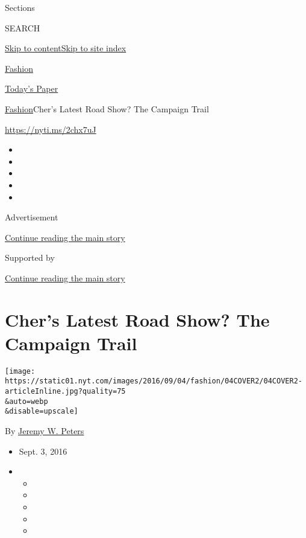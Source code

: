 Sections

SEARCH

\protect\hyperlink{site-content}{Skip to
content}\protect\hyperlink{site-index}{Skip to site index}

\href{https://www.nytimes.com/section/fashion}{Fashion}

\href{https://myaccount.nytimes.com/auth/login?response_type=cookie\&client_id=vi}{}

\href{https://www.nytimes.com/section/todayspaper}{Today's Paper}

\href{/section/fashion}{Fashion}\textbar{}Cher's Latest Road Show? The
Campaign Trail

\url{https://nyti.ms/2chx7uJ}

\begin{itemize}
\item
\item
\item
\item
\item
\end{itemize}

Advertisement

\protect\hyperlink{after-top}{Continue reading the main story}

Supported by

\protect\hyperlink{after-sponsor}{Continue reading the main story}

\hypertarget{chers-latest-road-show-the-campaign-trail}{%
\section{Cher's Latest Road Show? The Campaign
Trail}\label{chers-latest-road-show-the-campaign-trail}}

\texttt{[image: https://static01.nyt.com/images/2016/09/04/fashion/04COVER2/04COVER2-articleInline.jpg?quality=75\\\&auto=webp\\\&disable=upscale]}

By \href{http://www.nytimes.com/by/jeremy-w-peters}{Jeremy W. Peters}

\begin{itemize}
\item
  Sept. 3, 2016
\item
  \begin{itemize}
  \item
  \item
  \item
  \item
  \item
  \end{itemize}
\end{itemize}

